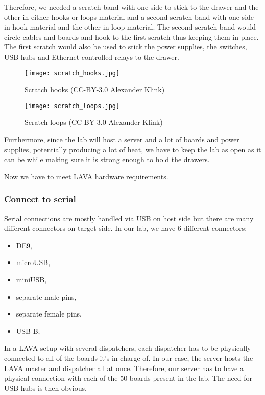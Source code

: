 Therefore, we needed a scratch band with one side to stick to the drawer and the other in either hooks or loops material and a second scratch band with one side in hook material and the other in loop material. The second scratch band would circle cables and boards and hook to the first scratch thus keeping them in place. The first scratch would also be used to stick the power supplies, the switches, USB hubs and Ethernet-controlled relays to the drawer.

\begin{figure}[H]
  \centering
  \begin{minipage}[b]{0.45\textwidth}
    \texttt{[image: scratch\_hooks.jpg]}
    \caption{Scratch hooks (CC-BY-3.0 Alexander Klink)}
  \end{minipage}
  \hfill
  \begin{minipage}[b]{0.45\textwidth}
    \texttt{[image: scratch\_loops.jpg]}
    \caption{Scratch loops (CC-BY-3.0 Alexander Klink)}
  \end{minipage}
\end{figure}

Furthermore, since the lab will host a server and a lot of boards and power supplies, potentially producing a lot of heat, we have to keep the lab as open as it can be while making sure it is strong enough to hold the drawers.

Now we have to meet LAVA hardware requirements.

\subsubsection{Connect to serial}

Serial connections are mostly handled via USB on host side but there are many different connectors on target side. In our lab, we have 6 different connectors:
\begin{itemize}
  \item DE9,
  \item microUSB,
  \item miniUSB,
  \item separate male pins,
  \item separate female pins,
  \item USB-B;
\end{itemize}

In a LAVA setup with several dispatchers, each dispatcher has to be physically connected to all of the boards it's in charge of. In our case, the server hosts the LAVA master and dispatcher all at once. Therefore, our server has to have a physical connection with each of the 50 boards present in the lab. The need for USB hubs is then obvious.

